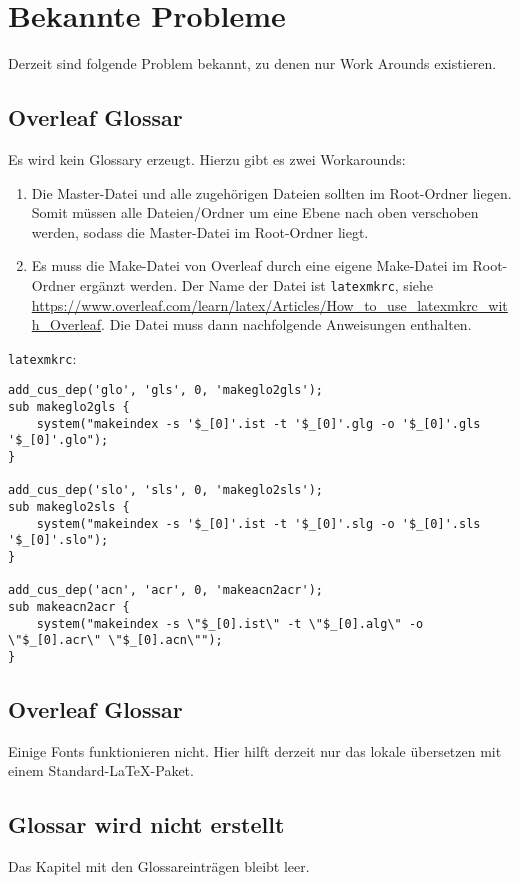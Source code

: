 %
\section{Bekannte Probleme}\label{sec:knownissues}
Derzeit sind folgende Problem bekannt, zu denen nur Work Arounds existieren.

\subsection{Overleaf Glossar}\label{sec:knownissues:overleaf_glossary}
Es wird kein Glossary erzeugt. Hierzu gibt es zwei Workarounds:
\begin{enumerate} 
	\item Die Master-Datei und alle zugehörigen Dateien sollten im Root-Ordner liegen. Somit müssen alle Dateien/Ordner um eine Ebene nach oben verschoben werden, sodass die Master-Datei im Root-Ordner liegt.
    \item Es muss die Make-Datei von Overleaf durch eine eigene Make-Datei im Root-Ordner ergänzt werden. Der Name der Datei ist \texttt{latexmkrc}, siehe \url{https://www.overleaf.com/learn/latex/Articles/How_to_use_latexmkrc_with_Overleaf}. Die Datei muss dann nachfolgende Anweisungen enthalten.
\end{enumerate}
    
\texttt{latexmkrc}:
\footnotesize{
\begin{verbatim} 
add_cus_dep('glo', 'gls', 0, 'makeglo2gls');
sub makeglo2gls {
    system("makeindex -s '$_[0]'.ist -t '$_[0]'.glg -o '$_[0]'.gls '$_[0]'.glo");
}

add_cus_dep('slo', 'sls', 0, 'makeglo2sls');
sub makeglo2sls {
    system("makeindex -s '$_[0]'.ist -t '$_[0]'.slg -o '$_[0]'.sls '$_[0]'.slo");
}

add_cus_dep('acn', 'acr', 0, 'makeacn2acr');
sub makeacn2acr {
    system("makeindex -s \"$_[0].ist\" -t \"$_[0].alg\" -o \"$_[0].acr\" \"$_[0].acn\"");
}
\end{verbatim}
}

\subsection{Overleaf Glossar}\label{sec:knownissues:overleaf_fonts}

Einige Fonts funktionieren nicht. Hier hilft derzeit nur das lokale übersetzen mit einem Standard-LaTeX-Paket.

\subsection{Glossar wird nicht erstellt}
Das Kapitel mit den Glossareinträgen bleibt leer.

